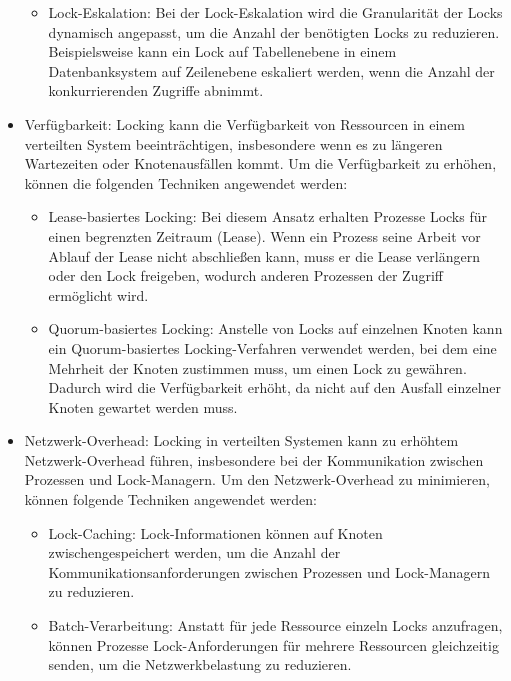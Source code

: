 \documentclass[../vs-script-first-v01.tex]{subfiles}
\begin{document}
\begin{itemize}
\begin{itemize}
\item Lock-Eskalation: Bei der Lock-Eskalation wird die Granularität der Locks dynamisch angepasst, um die Anzahl der benötigten Locks zu reduzieren. Beispielsweise kann ein Lock auf Tabellenebene in einem Datenbanksystem auf Zeilenebene eskaliert werden, wenn die Anzahl der konkurrierenden Zugriffe abnimmt.
\end{itemize}
\item Verfügbarkeit: Locking kann die Verfügbarkeit von Ressourcen in einem verteilten System beeinträchtigen, insbesondere wenn es zu längeren Wartezeiten oder Knotenausfällen kommt. Um die Verfügbarkeit zu erhöhen, können die folgenden Techniken angewendet werden:
\begin{itemize}
\item Lease-basiertes Locking: Bei diesem Ansatz erhalten Prozesse Locks für einen begrenzten Zeitraum (Lease). Wenn ein Prozess seine Arbeit vor Ablauf der Lease nicht abschließen kann, muss er die Lease verlängern oder den Lock freigeben, wodurch anderen Prozessen der Zugriff ermöglicht wird.

\item Quorum-basiertes Locking: Anstelle von Locks auf einzelnen Knoten kann ein Quorum-basiertes Locking-Verfahren verwendet werden, bei dem eine Mehrheit der Knoten zustimmen muss, um einen Lock zu gewähren. Dadurch wird die Verfügbarkeit erhöht, da nicht auf den Ausfall einzelner Knoten gewartet werden muss.
\end{itemize}
\item Netzwerk-Overhead: Locking in verteilten Systemen kann zu erhöhtem Netzwerk-Overhead führen, insbesondere bei der Kommunikation zwischen Prozessen und Lock-Managern. Um den Netzwerk-Overhead zu minimieren, können folgende Techniken angewendet werden:
\begin{itemize}
\item Lock-Caching: Lock-Informationen können auf Knoten zwischengespeichert werden, um die Anzahl der Kommunikationsanforderungen zwischen Prozessen und Lock-Managern zu reduzieren.
\item Batch-Verarbeitung: Anstatt für jede Ressource einzeln Locks anzufragen, können Prozesse Lock-Anforderungen für mehrere Ressourcen gleichzeitig senden, um die Netzwerkbelastung zu reduzieren.
\end{itemize}
\end{itemize}
\end{document}

